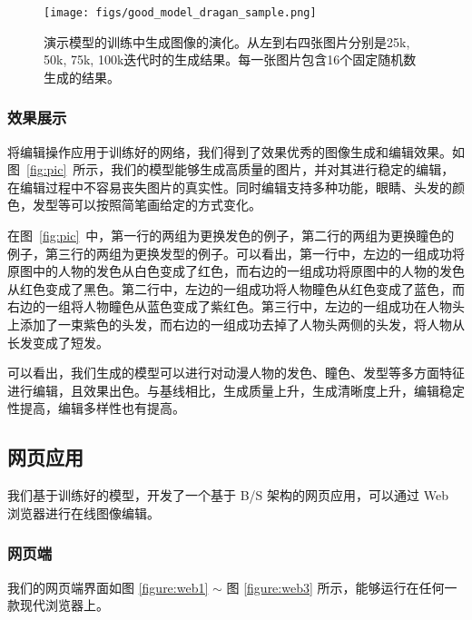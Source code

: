 \documentclass[a4paper,12pt,UTF8]{ctexart}
\newcommand{\kai}{\CJKfamily{zhkai}}	%
\begin{document}
\begin{figure}[H]
  \centering
  \texttt{[image: figs/good\_model\_dragan\_sample.png]}
  \caption{\kai 演示模型的训练中生成图像的演化。从左到右四张图片分别是25k, 50k, 75k, 100k迭代时的生成结果。每一张图片包含16个固定随机数生成的结果。}
  \label{fig:dragan_evolve}
\end{figure}

\subsubsection{效果展示}

将编辑操作应用于训练好的网络，我们得到了效果优秀的图像生成和编辑效果。如图~\ref{fig:pic}~所示，我们的模型能够生成高质量的图片，并对其进行稳定的编辑，在编辑过程中不容易丧失图片的真实性。同时编辑支持多种功能，眼睛、头发的颜色，发型等可以按照简笔画给定的方式变化。

在图~\ref{fig:pic}~中，第一行的两组为更换发色的例子，第二行的两组为更换瞳色的例子，第三行的两组为更换发型的例子。可以看出，第一行中，左边的一组成功将原图中的人物的发色从白色变成了红色，而右边的一组成功将原图中的人物的发色从红色变成了黑色。第二行中，左边的一组成功将人物瞳色从红色变成了蓝色，而右边的一组将人物瞳色从蓝色变成了紫红色。第三行中，左边的一组成功在人物头上添加了一束紫色的头发，而右边的一组成功去掉了人物头两侧的头发，将人物从长发变成了短发。

可以看出，我们生成的模型可以进行对动漫人物的发色、瞳色、发型等多方面特征进行编辑，且效果出色。与基线相比，生成质量上升，生成清晰度上升，编辑稳定性提高，编辑多样性也有提高。

\subsection{网页应用}

我们基于训练好的模型，开发了一个基于 B/S 架构的网页应用，可以通过 Web 浏览器进行在线图像编辑。

\subsubsection{网页端}
我们的网页端界面如图 \ref{figure:web1} $\sim$ 图 \ref{figure:web3}  所示，能够运行在任何一款现代浏览器上。
\end{document}
